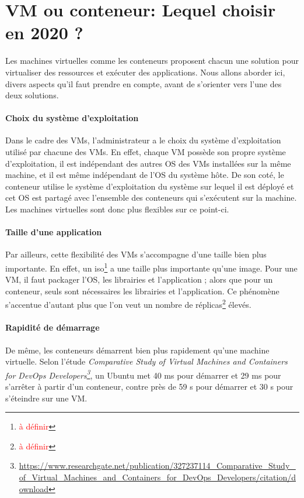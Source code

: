 \documentclass[11pt,fleqn]{book} %
\begin{document}
\section{VM ou conteneur: Lequel choisir en 2020 ? }
Les machines virtuelles comme les conteneurs proposent chacun une solution pour virtualiser des ressources et exécuter des applications. Nous allons aborder ici, divers aspects qu'il faut prendre en compte, avant de s'orienter vers l'une des deux solutions.

\paragraph{Choix du système d'exploitation}
Dans le cadre des VMs, l'administrateur a le choix du système d'exploitation utilisé par chacune des VMs. En effet, chaque VM possède son propre système d'exploitation, il est indépendant des autres OS des VMs installées sur la même machine, et il est même indépendant de l'OS du système hôte. De son coté, le conteneur utilise le système d'exploitation du système sur lequel il est déployé et cet OS est partagé avec l'ensemble des conteneurs qui s'exécutent sur la machine. Les machines virtuelles sont donc plus flexibles sur ce point-ci.

\paragraph{Taille d'une application}
Par ailleurs, cette flexibilité des VMs s'accompagne d'une taille bien plus importante. En effet, un iso\footnote{\textcolor{red}{à définir}} a une taille plus importante qu'une image. Pour une VM, il faut packager l'OS, les librairies et l'application ; alors que pour un conteneur, seuls sont nécessaires les librairies et l'application. Ce phénomène s'accentue d'autant plus que l'on veut un nombre de réplicas\footnote{\textcolor{red}{à définir}} élevés.

\paragraph{Rapidité de démarrage}
De même, les conteneurs démarrent bien plus rapidement qu'une machine virtuelle.
Selon l'étude \textit{Comparative Study of Virtual Machines and Containers for DevOps Developers\footnote{\url{https://www.researchgate.net/publication/327237114_Comparative_Study_of_Virtual_Machines_and_Containers_for_DevOps_Developers/citation/download}}}, un Ubuntu met 40 ms pour démarrer et 29 ms pour s'arrêter à partir d'un conteneur, contre près de 59 s pour démarrer et 30 s pour s'éteindre sur une VM.
\end{document}
